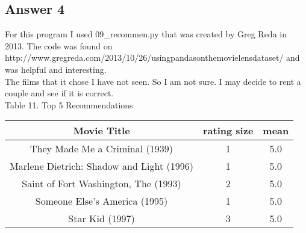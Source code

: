 \documentclass[10pt,letterpaper]{article}
\begin{document}
\subsection{Answer 4}
For this program I used 09\_recommen.py that was created by Greg Reda in 2013.  The code was found on http://www.gregreda.com/2013/10/26/using\-pandas\-on\-the\-movielens\-dataset/ and was helpful and interesting.
\\
The films that it chose I have not seen.  So I am not sure.  I may decide to rent a couple and see if it is correct.\\

Table 11. Top 5 Recommendations\\
\begin{center}
  \begin{tabular}{ | c | c | c }
    \hline
     Movie Title & rating size & mean\\ \hline                                                 
     They Made Me a Criminal (1939)           & 1 & 5.0\\ \hline                                                 
     Marlene Dietrich: Shadow and Light (1996)& 1 & 5.0\\ \hline                                                 
     Saint of Fort Washington, The (1993)     & 2 & 5.0\\ \hline                                                 
     Someone Else's America (1995)            & 1 & 5.0\\ \hline                                                 
     Star Kid (1997)                          & 3 & 5.0\\ \hline                                                 
    \hline
  \end{tabular}
\end{center}
\end{document}
